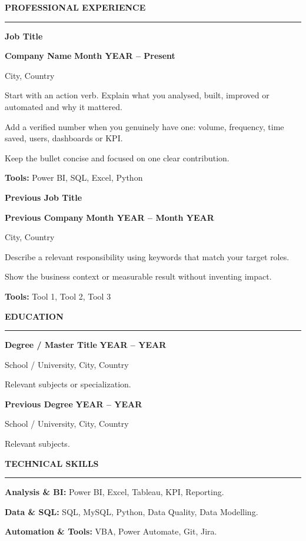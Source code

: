 \documentclass[10pt,a4paper]{article}
\newcommand{\sectiontitle}[1]{%
  \vspace{0.10cm}%
  {\fontsize{10.5pt}{11.1pt}\selectfont
  \bfseries #1}\par
  \vspace{-0.06cm}%
  {\color{accent}\rule{\linewidth}{0.55pt}}\par
  \vspace{0.02cm}%
}
\newcommand{\jobheader}[4]{%
  {\fontsize{9pt}{9.6pt}\selectfont
  \bfseries #1}\par

  {\fontsize{8.5pt}{9.1pt}\selectfont
  \textbf{#2}
  \hfill
  \textbf{#4}}\par

  {\fontsize{7.9pt}{8.4pt}\selectfont
  #3}\par

  \vspace{0.03cm}
}
\newcommand{\cvbullet}[1]{%
  \noindent
  \hangindent=0.28cm
  \hangafter=1
  \makebox[0.22cm][l]{\textbullet}%
  {\fontsize{8.15pt}{9.05pt}\selectfont #1}\par
  \vspace{0.02cm}
}
\newcommand{\tools}[1]{%
  {\fontsize{7.9pt}{8.65pt}\selectfont
  \textbf{Tools:} #1}\par
}
\newcommand{\edu}[4]{%
  {\fontsize{8.35pt}{8.95pt}\selectfont
  \textbf{#1}
  \hfill
  \textbf{#3}}\par

  {\fontsize{7.8pt}{8.4pt}\selectfont
  #2}\par

  {\fontsize{7.65pt}{8.25pt}\selectfont
  #4}\par

  \vspace{0.07cm}
}
\begin{document}
\sectiontitle{PROFESSIONAL EXPERIENCE}

\jobheader
{Job Title}
{Company Name}
{City, Country}
{Month YEAR -- Present}

\cvbullet{
Start with an action verb.
Explain what you analysed, built,
improved or automated and why it mattered.
}

\cvbullet{
Add a verified number when you genuinely
have one: volume, frequency, time saved,
users, dashboards or KPI.
}

\cvbullet{
Keep the bullet concise and focused
on one clear contribution.
}

\tools{
Power BI, SQL, Excel, Python
}

\vspace{0.10cm}

\jobheader
{Previous Job Title}
{Previous Company}
{City, Country}
{Month YEAR -- Month YEAR}

\cvbullet{
Describe a relevant responsibility using
keywords that match your target roles.
}

\cvbullet{
Show the business context or measurable
result without inventing impact.
}

\tools{
Tool 1, Tool 2, Tool 3
}


\sectiontitle{EDUCATION}

\edu
{Degree / Master Title}
{School / University, City, Country}
{YEAR -- YEAR}
{Relevant subjects or specialization.}

\edu
{Previous Degree}
{School / University, City, Country}
{YEAR -- YEAR}
{Relevant subjects.}


\sectiontitle{TECHNICAL SKILLS}

{\fontsize{8pt}{8.7pt}\selectfont

\textbf{Analysis \& BI:}
Power BI, Excel, Tableau, KPI, Reporting.
\par

\textbf{Data \& SQL:}
SQL, MySQL, Python,
Data Quality, Data Modelling.
\par

\textbf{Automation \& Tools:}
VBA, Power Automate, Git, Jira.
\par
}
\end{document}
